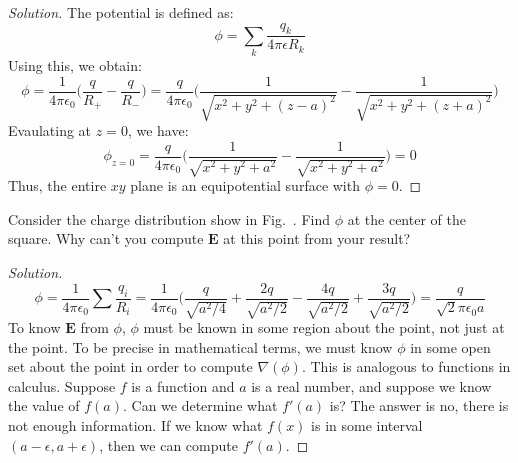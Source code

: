 \documentclass[crop=false,class=book,oneside]{standalone}
\begin{document}
            \begin{proof}[Solution]
                The potential is defined as:
                \begin{equation*}
                    \phi=\sum_{k}\frac{q_{k}}{4\pi\epsilon{R_{k}}}
                \end{equation*}
                Using this, we obtain:
                \begin{equation*}
                    \phi
                    =\frac{1}{4\pi\epsilon_0}\bigg(
                        \frac{q}{R_{+}}-\frac{q}{R_{-}}
                    \bigg)
                    =\frac{q}{4\pi\epsilon_0}
                    \bigg(
                        \frac{1}{\sqrt{x^2+y^2+(z-a)^2}}
                        -\frac{1}{\sqrt{x^2+y^2+(z+a)^2}}
                    \bigg)
                \end{equation*}
                Evaulating at $z=0$, we have:
                \begin{equation*}
                    \phi_{z=0}
                    =\frac{q}{4\pi\epsilon_0}\bigg(
                        \frac{1}{\sqrt{x^2+y^2+a^2}}
                        -\frac{1}{\sqrt{x^2+y^2+a^2}}
                    \bigg)
                    =0
                \end{equation*}
                Thus, the entire $xy$ plane is an
                equipotential surface with $\phi=0$.
            \end{proof}
            \begin{problem}[Wangsness 5-4]
                \label{problem:EMAG_Wangsness_5_4}
                Consider the charge distribution show in
                Fig.~.
                Find $\phi$ at the center of the square.
                Why can't you compute $\mathbf{E}$ at this
                point from your result?
            \end{problem}
            \begin{proof}[Solution]
            \begin{equation*}
                \phi=\frac{1}{4\pi\epsilon_{0}}
                \sum\frac{q_{i}}{R_{i}}
                =\frac{1}{4\pi \epsilon_0}\bigg(
                    \frac{q}{\sqrt{a^2/4}}
                    +\frac{2q}{\sqrt{a^2/2}}
                    -\frac{4q}{\sqrt{a^2/2}}
                    +\frac{3q}{\sqrt{a^2/2}}
                \bigg)
                =\frac{q}{\sqrt{2}\pi\epsilon_{0}a}    
            \end{equation*}
            To know $\mathbf{E}$ from $\phi$,
            $\phi$ must be known in some region about the point,
            not just at the point. To be precise in mathematical terms,
            we must know $\phi$ in some open set about the point in
            order to compute $\nabla(\phi)$. This is analogous to
            functions in calculus. Suppose $f$ is a function and
            $a$ is a real number, and suppose we know the value
            of $f(a)$. Can we determine what $f'(a)$ is?
            The answer is no, there is not enough information.
            If we know what $f(x)$ is in some interval $(a-\epsilon,a+\epsilon)$, then we can compute $f'(a)$.
            \end{proof}
\end{document}
